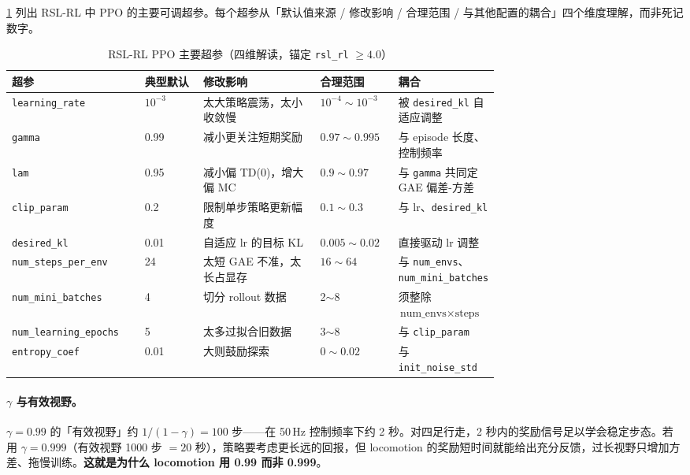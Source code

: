 \cref{tab:rlmc-mgr-ppohyper} 列出 RSL-RL 中 PPO 的主要可调超参。每个超参从「默认值来源 / 修改影响 / 合理范围 / 与其他配置的耦合」四个维度理解，而非死记数字。

\begin{table}[ht]
\centering
\caption{RSL-RL PPO 主要超参（四维解读，锚定 \texttt{rsl\_rl} $\ge 4.0$）}
\label{tab:rlmc-mgr-ppohyper}
\footnotesize
\begin{tabular}{@{}lp{0.12\linewidth}p{0.24\linewidth}p{0.16\linewidth}p{0.2\linewidth}@{}}
\toprule
超参 & 典型默认 & 修改影响 & 合理范围 & 耦合 \\
\midrule
\verb|learning_rate| & $10^{-3}$ & 太大策略震荡，太小收敛慢 & $10^{-4}\!\sim\!10^{-3}$ & 被 \verb|desired_kl| 自适应调整 \\
\verb|gamma| & 0.99 & 减小更关注短期奖励 & $0.97\!\sim\!0.995$ & 与 episode 长度、控制频率 \\
\verb|lam| & 0.95 & 减小偏 TD(0)，增大偏 MC & $0.9\!\sim\!0.97$ & 与 \verb|gamma| 共同定 GAE 偏差-方差 \\
\verb|clip_param| & 0.2 & 限制单步策略更新幅度 & $0.1\!\sim\!0.3$ & 与 lr、\verb|desired_kl| \\
\verb|desired_kl| & 0.01 & 自适应 lr 的目标 KL & $0.005\!\sim\!0.02$ & 直接驱动 lr 调整 \\
\verb|num_steps_per_env| & 24 & 太短 GAE 不准，太长占显存 & $16\!\sim\!64$ & 与 \verb|num_envs|、\verb|num_mini_batches| \\
\verb|num_mini_batches| & 4 & 切分 rollout 数据 & 2$\sim$8 & 须整除 $\text{num\_envs}\!\times\!\text{steps}$ \\
\verb|num_learning_epochs| & 5 & 太多过拟合旧数据 & 3$\sim$8 & 与 \verb|clip_param| \\
\verb|entropy_coef| & 0.01 & 大则鼓励探索 & $0\!\sim\!0.02$ & 与 \verb|init_noise_std| \\
\bottomrule
\end{tabular}
\end{table}

\paragraph{$\gamma$ 与有效视野。}$\gamma=0.99$ 的「有效视野」约 $1/(1-\gamma)=100$ 步——在 50\,Hz 控制频率下约 2 秒。对四足行走，2 秒内的奖励信号足以学会稳定步态。若用 $\gamma=0.999$（有效视野 1000 步 $=20$ 秒），策略要考虑更长远的回报，但 locomotion 的奖励短时间就能给出充分反馈，过长视野只增加方差、拖慢训练。\textbf{这就是为什么 locomotion 用 0.99 而非 0.999}。

